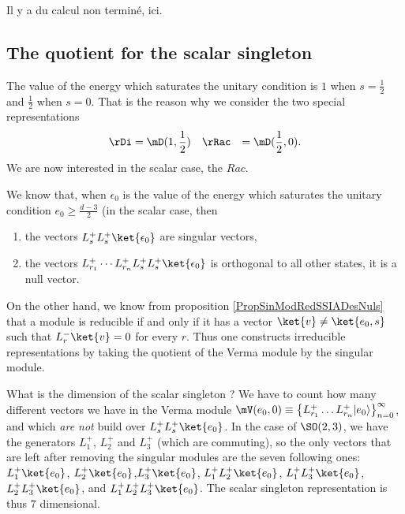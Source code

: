 \begin{probleme}
Il y a du calcul non terminé, ici.
\end{probleme}

					\subsection{The quotient for the scalar singleton}

The value of the energy which saturates the unitary condition is $1$ when $s=\frac{1}{ 2 }$ and $\frac{ 1 }{2}$ when $s=0$. That is the reason why we consider the two special representations
\begin{equation}
	\begin{aligned}[]
		\rDi&=\mD(1,\frac{ 1 }{2})		&& \rRac&=\mD(\frac{ 1 }{2},0).
	\end{aligned}
\end{equation}
We are now interested in the scalar case, the $Rac$.

We know that, when $\epsilon_0$ is the value of the energy which saturates the unitary condition $e_0\geq \frac{ d-3 }{ 2 }$ (in the scalar case, then
\begin{enumerate}
\item the vectors $L^+_sL^+_s\ket{\epsilon_0}$ are singular vectors,
\item the vectors $L^+_{r_1}\cdots L^+_{r_n}L^+_sL^+_s\ket{\epsilon_0}$ is orthogonal to all other states, it is a null vector.
\end{enumerate}
On the other hand, we know from proposition \ref{PropSinModRedSSIADesNuls} that a module is reducible if and only if it has a vector $\ket{v}\neq\ket{e_0,s}$ such that $L^-_r\ket{v}=0$ for every $r$. Thus one constructs irreducible representations by taking the quotient of the Verma module by the singular module. 

What is the dimension of the scalar singleton ? We have to count how many different vectors we have in the Verma module $\mV(e_0,0)\equiv \big\{   L_{r_1}^+\ldots L_{r_n}^+| e_0 \rangle   \big\}_{n=0}^{\infty}$, and which \emph{are not} build over $L^+_sL^+_s\ket{e_0}$. In the case of $\SO(2,3)$, we have the generators $L^+_1$, $L^+_2$ and $L^+_3$ (which are commuting), so the only vectors that are left after removing the singular modules are the seven following ones: $L^+_1\ket{e_0}$, $L^+_2\ket{e_0}$,$L^+_3\ket{e_0}$, $L^+_1L^+_2\ket{e_0}$, $L^+_1L^+_3\ket{e_0}$,$L^+_2L^+_3\ket{e_0}$, and $L^+_1L^+_2L^+_3\ket{e_0}$. The scalar singleton representation is thus $7$ dimensional.

